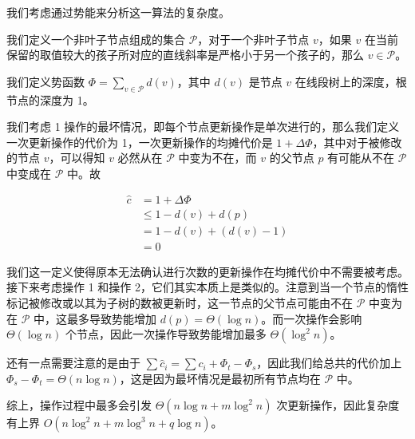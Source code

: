 \documentclass[12pt]{ctexart}
\begin{document}
我们考虑通过势能来分析这一算法的复杂度。

我们定义一个非叶子节点组成的集合 $\mathcal P$，对于一个非叶子节点 $v$，如果 $v$ 在当前保留的取值较大的孩子所对应的直线斜率是严格小于另一个孩子的，那么 $v\in \mathcal P$。

我们定义势函数 $\Phi = \sum_{v\in \mathcal P} d(v)$，其中 $d(v)$ 是节点 $v$ 在线段树上的深度，根节点的深度为 1。

我们考虑 1 操作的最坏情况，即每个节点更新操作是单次进行的，那么我们定义一次更新操作的代价为 1，一次更新操作的均摊代价是 $1 + \Delta\Phi$，其中对于被修改的节点 $v$，可以得知 $v$ 必然从在 $\mathcal P$ 中变为不在，而 $v$ 的父节点 $p$ 有可能从不在 $\mathcal P$ 中变成在 $\mathcal P$ 中。故

\begin{align*}
\widehat c &= 1 + \Delta \Phi\\
&\le 1 - d(v) + d(p) \\
&= 1 - d(v) + (d(v) - 1)\\
&= 0
\end{align*}

我们这一定义使得原本无法确认进行次数的更新操作在均摊代价中不需要被考虑。接下来考虑操作 1 和操作 2，它们其实本质上是类似的。注意到当一个节点的惰性标记被修改或以其为子树的数被更新时，这一节点的父节点可能由不在 $\mathcal P$ 中变为在 $\mathcal P$ 中，这最多导致势能增加 $d(p) = \Theta(\log n)$。而一次操作会影响 $\Theta(\log n)$ 个节点，因此一次操作导致势能增加最多 $\Theta(\log^2 n)$。

还有一点需要注意的是由于 $\sum \widehat c_i = \sum c_i + \Phi_t - \Phi_s$，因此我们给总共的代价加上 $\Phi_s - \Phi_t = \Theta(n\log n)$，这是因为最坏情况是最初所有节点均在 $\mathcal P$ 中。

综上，操作过程中最多会引发 $\Theta(n\log n + m\log^2 n)$ 次更新操作，因此复杂度有上界 $O(n\log^2 n + m\log^3 n + q\log n)$。
\end{document}
